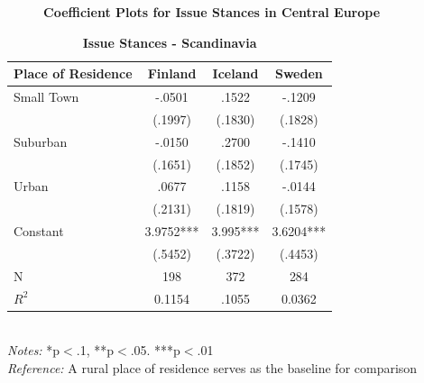 \documentclass[12pt, titlepage]{article}
\newcommand\e{\emph}
\newcommand\tb{\textbf}
\begin{document}
\begin{figure}[H]
\begin{subfigure}[b]{0.475\textwidth}
	\end{subfigure}
	\caption[ \tb{Issue Stances - Central Europe} ]
	{\tb {Coefficient Plots for Issue Stances in Central Europe} }
	\label{CentEuroLibCoef}
\end{figure}


\begin{singlespace}
	\begin{table}[H]
		\centering
		\caption{\tb{Issue Stances - Scandinavia}}
		\begin{tabulary}{\linewidth}{l c c c}
			\hline
			\tb{Place of Residence}&\tb{Finland}&\tb{Iceland}&\tb{Sweden} \\
			\hline
			Small Town& -.0501 &.1522 & -.1209 \\
			&(.1997) & (.1830) & (.1828) \\
			Suburban&-.0150&.2700  &-.1410  \\
			&(.1651) &(.1852) & (.1745) \\
			Urban &.0677 &.1158  & -.0144 \\
			&(.2131) & (.1819) & (.1578) \\
			Constant&3.9752*** &3.995***  & 3.6204*** \\
			&(.5452) &(.3722) & (.4453) \\
			N&198&372 &284  \\
			$R^2$&0.1154&.1055  & 0.0362 \\  
			\hline
\end{tabulary}
\\
\e{Notes:} *p$<$.1, **p$<$.05. ***p$<$.01 \\
\e{Reference:} A rural place of residence serves as the baseline for comparison
\label{ScanLib}
\end{table}
\end{singlespace}
\end{document}
